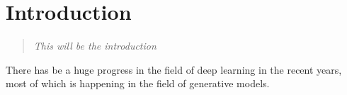 \chapter{Introduction}

\begin{quote}
\textit{This will be the introduction}
\end{quote}


There has be a huge progress in the field of deep learning in the recent years, most of which is happening in the field of generative models. 



